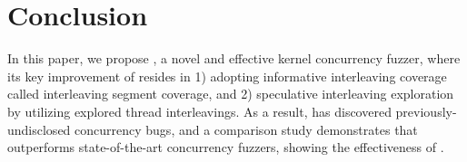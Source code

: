 \section{Conclusion}
\label{s:conclusion}




In this paper, we propose \sys, a novel and effective kernel
concurrency fuzzer, where its key improvement of \sys resides in 1)
adopting informative interleaving coverage called interleaving segment
coverage, and 2) speculative interleaving exploration by utilizing
explored thread interleavings.
%
As a result, \sys has discovered \totalbugs previously-undisclosed
concurrency bugs, and a comparison study demonstrates that \sys
outperforms state-of-the-art concurrency fuzzers, showing the
effectiveness of \sys.



